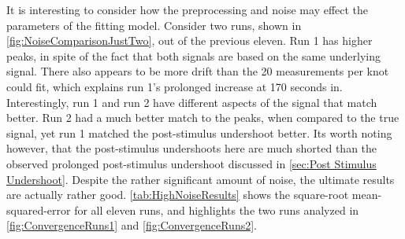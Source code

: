 It is interesting to consider how the preprocessing and noise may effect the
parameters of the fitting model. Consider two runs, shown in 
\autoref{fig:NoiseComparisonJustTwo}, out of the previous eleven. 
Run 1 has higher peaks, in spite of the fact that both signals are based
on the same underlying signal. There also appears
to be more drift than the 20 measurements per knot could fit, which explains run 1's
prolonged increase at 170 seconds in. Interestingly, run 1 and run 2 have different
aspects of the signal that match better. Run 2 had a much better match to the 
peaks, when compared to the true signal, yet run 1 matched the post-stimulus
undershoot better. Its worth noting however, that the post-stimulus undershoots
here are much shorted than the observed prolonged post-stimulus undershoot
discussed in \autoref{sec:Post Stimulus Undershoot}. 
Despite the rather significant amount of noise, the ultimate results are 
actually rather good. \autoref{tab:HighNoiseResults} shows
the square-root mean-squared-error for all eleven runs, and highlights the two runs analyzed 
in \autoref{fig:ConvergenceRuns1} and \autoref{fig:ConvergenceRuns2}.

